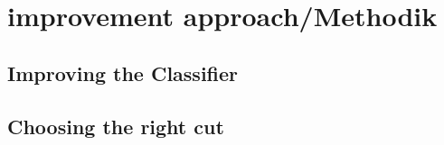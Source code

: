 \section{improvement approach/Methodik}
\subsection{Improving the Classifier}
\subsection{Choosing the right cut}